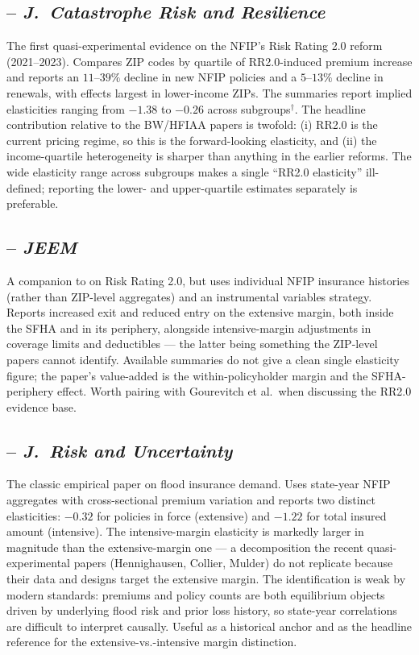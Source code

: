 \documentclass[11pt]{article}
\begin{document}
\subsection*{\citet{gourevitch2025} -- \textit{J.~Catastrophe Risk and Resilience}}
The first quasi-experimental evidence on the NFIP's Risk Rating 2.0 reform
(2021--2023). Compares ZIP codes by quartile of RR2.0-induced premium increase
and reports an $11$--$39\%$ decline in new NFIP policies and a $5$--$13\%$
decline in renewals, with effects largest in lower-income ZIPs. The summaries
report implied elasticities ranging from $-1.38$ to $-0.26$ across
subgroups$^\dagger$. The headline contribution relative to the BW/HFIAA papers
is twofold: (i) RR2.0 is the current pricing regime, so this is the
forward-looking elasticity, and (ii) the income-quartile heterogeneity is
sharper than anything in the earlier reforms. The wide elasticity range across
subgroups makes a single ``RR2.0 elasticity'' ill-defined; reporting the lower-
and upper-quartile estimates separately is preferable.

\subsection*{\citet{ortega2025} -- \textit{JEEM}}
A companion to \citet{gourevitch2025} on Risk Rating 2.0, but uses individual
NFIP insurance histories (rather than ZIP-level aggregates) and an instrumental
variables strategy. Reports increased exit and reduced entry on the extensive
margin, both inside the SFHA and in its periphery, alongside intensive-margin
adjustments in coverage limits and deductibles --- the latter being something
the ZIP-level papers cannot identify. Available summaries do not give a clean
single elasticity figure; the paper's value-added is the within-policyholder
margin and the SFHA-periphery effect. Worth pairing with Gourevitch et al.\
when discussing the RR2.0 evidence base.

\subsection*{\citet{browne2000} -- \textit{J.~Risk and Uncertainty}}
The classic empirical paper on flood insurance demand. Uses state-year NFIP
aggregates with cross-sectional premium variation and reports two distinct
elasticities: $-0.32$ for policies in force (extensive) and $-1.22$ for total
insured amount (intensive). The intensive-margin elasticity is markedly larger
in magnitude than the extensive-margin one --- a decomposition the recent
quasi-experimental papers (Hennighausen, Collier, Mulder) do not replicate
because their data and designs target the extensive margin. The identification
is weak by modern standards: premiums and policy counts are both equilibrium
objects driven by underlying flood risk and prior loss history, so
state-year correlations are difficult to interpret causally. Useful as a
historical anchor and as the headline reference for the extensive-vs.-intensive
margin distinction.
\end{document}
